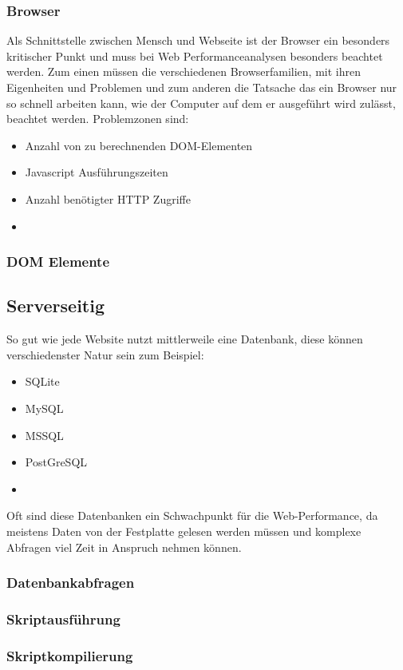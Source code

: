 \subsubsection{Browser}
Als Schnittstelle zwischen Mensch und Webseite ist der Browser ein besonders kritischer Punkt und muss bei Web Performanceanalysen besonders beachtet werden. Zum einen müssen die verschiedenen Browserfamilien, mit ihren Eigenheiten und Problemen und zum anderen die Tatsache das ein Browser nur so schnell arbeiten kann, wie der Computer auf dem er ausgeführt wird zulässt, beachtet werden. Problemzonen sind:
\begin{itemize}
  \item Anzahl von zu berechnenden DOM-Elementen
  \item Javascript Ausführungszeiten
  \item Anzahl benötigter HTTP Zugriffe
  \item 

\end{itemize}

\subsubsection{DOM Elemente}
\subsection{Serverseitig}
So gut wie jede Website nutzt mittlerweile eine Datenbank, diese können verschiedenster Natur sein zum Beispiel:
\begin{itemize}
\item SQLite
\item MySQL
\item MSSQL
\item PostGreSQL
\item 
\end{itemize}
Oft sind diese Datenbanken ein Schwachpunkt für die Web-Performance, da meistens Daten von der Festplatte gelesen werden müssen und komplexe Abfragen viel Zeit in Anspruch nehmen können.
\subsubsection{Datenbankabfragen}

\subsubsection{Skriptausführung}
\subsubsection{Skriptkompilierung}


